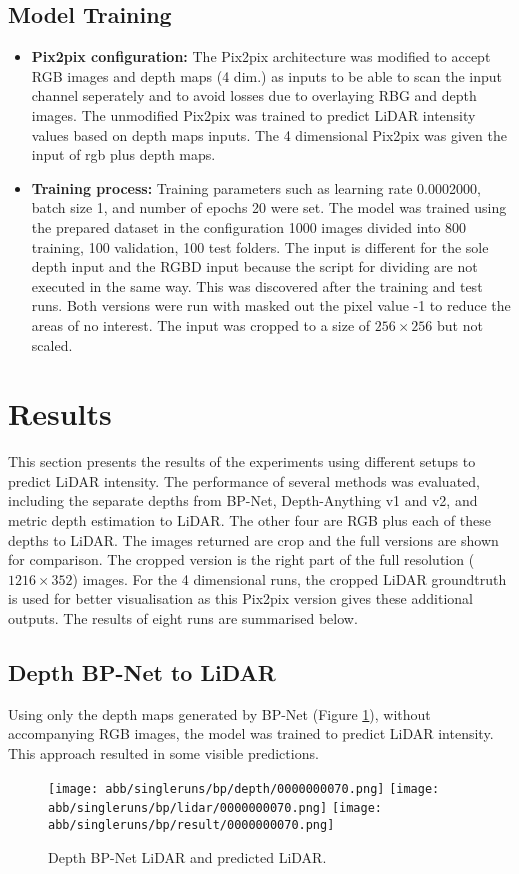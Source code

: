 \subsection{Model Training}\label{modeltraining}
\begin{itemize}
	\item \textbf{Pix2pix configuration:} The Pix2pix architecture was modified to accept RGB images and depth maps (4 dim.) as inputs to be able to scan the input channel seperately and to avoid losses due to overlaying RBG and depth images. The unmodified Pix2pix was trained to predict LiDAR intensity values based on depth maps inputs. The 4 dimensional Pix2pix was given the input of rgb plus depth maps.
	\item \textbf{Training process:} Training parameters such as learning rate 0.0002000, batch size 1, and number of epochs 20 were set. The model was trained using the prepared dataset in the configuration 1000 images divided into 800 training, 100 validation, 100 test folders. The input is different for the sole depth input and the RGBD input because the script for dividing are not executed in the same way. This was discovered after the training and test runs. Both versions were run with masked out the pixel value -1 to reduce the areas of no interest. The input was cropped to a size of $256 \times 256$  but not scaled.
\end{itemize}

\section{Results} \label{results}
This section presents the results of the experiments using different setups to predict LiDAR intensity. The performance of several methods was evaluated, including the separate depths from BP-Net, Depth-Anything v1 and v2, and metric depth estimation to LiDAR. The other four are RGB plus each of these depths to LiDAR. The images returned are crop and the full versions are shown for comparison. The cropped version is the right part of the full resolution ($1216 \times 352$) images. For the 4 dimensional runs, the cropped LiDAR groundtruth is used for better visualisation as this Pix2pix version gives these additional outputs. The results of eight runs are summarised below.
\subsection{Depth BP-Net to LiDAR}

Using only the depth maps generated by BP-Net (Figure \ref{bp_results}), without accompanying RGB images, the model was trained to predict LiDAR intensity. This approach resulted in some visible predictions.
\begin{figure}[!ht]
	\centering
	\texttt{[image: abb/singleruns/bp/depth/0000000070.png]}
	\texttt{[image: abb/singleruns/bp/lidar/0000000070.png]}
	\texttt{[image: abb/singleruns/bp/result/0000000070.png]}
	\caption{Depth BP-Net LiDAR and predicted LiDAR.}
	\label{bp_results}
\end{figure}
\newpage
